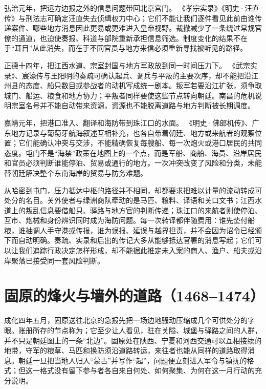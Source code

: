弘治元年，把远方边报之外的信息问题带回北京宫门。 《孝宗实录》《明史·汪直传》与刑法志可确定汪直失去侦缉权力中心；它们不能让我们逐件看见此前由谁传递案件、哪些地方消息因此更易或更难进入皇帝视野。裁撤减少了一条绕过常规官僚的通道，也迫使奏报、科道与部院重新承担信息筛选。制度变化的结果不在于“耳目”从此消失，而在于不同官员与地方来信必须重新寻找被听见的路径。

正德十四年，把江西水道、宗室封国与地方军政放到同一时间压力下。 《武宗实录》、宸濠传与王阳明的奏疏可确认起兵、调兵与平叛的主要次序，却不能把沿江州县的态度、船只数目或参战者的动机写成统一剧本。叛军若要沿江扩张，须争取城门、船运、粮食和地方协力；平叛者同样要使这些节点转向朝廷。南昌的危机说明宗室名号并不能自动带来资源，资源也不能脱离道路与地方判断被长期调度。

嘉靖元年，把港口准入、翻译和海防带到珠江口的水面。 《明史·佛郎机传》、广东地方记录与葡萄牙航海叙述互相补充，也各自带着朝廷、地方或来航者的观察位置；它们能确认冲突与交涉，不能精确恢复每艘船、每一次炮火或港口居民的共同态度。屯门不是“海禁”政策在地图上的一个点，而是军船、商船、海员、沿岸居民和官员必须判断谁能停泊、贸易或通行的地方。一次冲突改变了风险和分类，未能替朝廷解决整个东南海岸的贸易与防务难题。

从哈密到屯门，压力抵达中枢的路径并不相同，却都要求把难以计量的流动转成可处分的名目。关外使者与绿洲商队牵动的是马匹、粮料、译语和关口文书；江西水道上的叛乱信息要借船只、驿路与地方官的判断传递；珠江口的来航者则使停泊、互市、炮械和身份辨识同时成为海防问题。每一次转译都伴随费用：谁先垫付船粮，谁抽调人手守港或传报，谁为误报、延误与越界担责，并不会因为诏令已经颁下而自动明确。奏疏、实录和后出的传记大多从能够抵达官署的消息写起；它们可以让我们追踪行政决定怎样形成，却不能据此推定未入案的商人、渔户、船夫或沿岸聚落已接受同一套风险判断。

\section{固原的烽火与墙外的道路（1468--1474）}

成化四年五月，固原送往北京的急报先把一场边地骚动压缩成几个可供处分的字眼。账册所存的节点称为；它至少让人看见，驻在关隘、城堡与驿路之间的人群，并不只是朝廷图上的一条“北边”。固原处在陕西、宁夏和河西交通可以互相接续的地带，守军的粮草、马匹和换防须沿道路转运，来往者也能从同样的道路取得消息。朝廷一旦把当地人归入“蒙古”并写作“起”，问题便立刻进入军令与镇抚的格式；但这一格式没有留下参与者各自来自何处、如何聚集、为何在这一月行动的充分说明。

